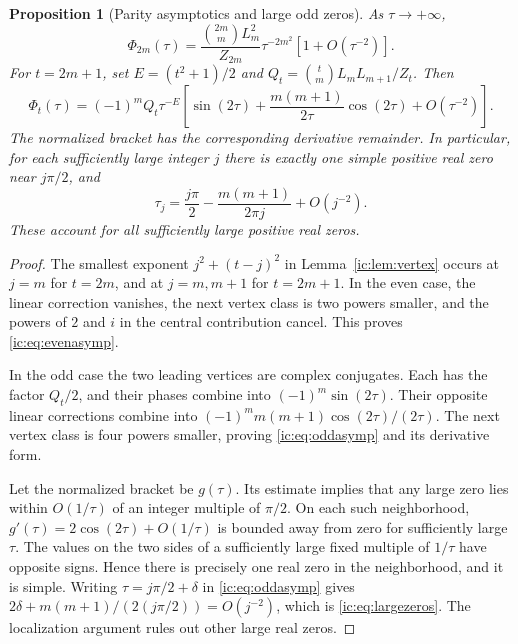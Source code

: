 \documentclass[11pt,a4paper]{article}
\numberwithin{equation}{section}
\newtheorem{proposition}[theorem]{Proposition}
\theoremstyle{definition}
\theoremstyle{remark}
\begin{document}
\begin{proposition}[Parity asymptotics and large odd zeros]
\label{ic:prop:largezeros}
As $\tau\to+\infty$,
\begin{equation}\label{ic:eq:evenasymp}
 \Phi_{2m}(\tau)=
 \frac{\binom{2m}{m}L_m^2}{Z_{2m}}
 \tau^{-2m^2}\left[1+O(\tau^{-2})\right].
\end{equation}
For $t=2m+1$, set $E=(t^2+1)/2$ and
$Q_t=\binom tm L_mL_{m+1}/Z_t$. Then
\begin{equation}\label{ic:eq:oddasymp}
 \Phi_t(\tau)=(-1)^m Q_t\tau^{-E}
 \left[\sin(2\tau)+\frac{m(m+1)}{2\tau}\cos(2\tau)
                  +O(\tau^{-2})\right].
\end{equation}
The normalized bracket has the corresponding derivative remainder.
In particular, for each sufficiently large integer $j$ there is exactly
one simple positive real zero near $j\pi/2$, and
\begin{equation}\label{ic:eq:largezeros}
 \tau_j=\frac{j\pi}{2}-\frac{m(m+1)}{2\pi j}+O(j^{-2}).
\end{equation}
These account for all sufficiently large positive real zeros.
\end{proposition}
\begin{proof}
The smallest exponent $j^2+(t-j)^2$ in Lemma~\ref{ic:lem:vertex} occurs
at $j=m$ for $t=2m$, and at $j=m,m+1$ for $t=2m+1$. In the even case,
the linear correction vanishes, the next vertex class is two powers
smaller, and the powers of $2$ and $i$ in the central contribution
cancel. This proves \eqref{ic:eq:evenasymp}.

In the odd case the two leading vertices are complex conjugates. Each
has the factor $Q_t/2$, and their phases combine into
$(-1)^m\sin(2\tau)$. Their opposite linear corrections combine into
$(-1)^m m(m+1)\cos(2\tau)/(2\tau)$. The next vertex class is four powers
smaller, proving \eqref{ic:eq:oddasymp} and its derivative form.

Let the normalized bracket be $g(\tau)$. Its estimate implies that any
large zero lies within $O(1/\tau)$ of an integer multiple of $\pi/2$.
On each such neighborhood, $g'(\tau)=2\cos(2\tau)+O(1/\tau)$ is bounded
away from zero for sufficiently large $\tau$. The values on the two
sides of a sufficiently large fixed multiple of $1/\tau$ have opposite
signs. Hence there is precisely one real zero in the neighborhood, and
it is simple. Writing $\tau=j\pi/2+\delta$ in \eqref{ic:eq:oddasymp} gives
$2\delta+m(m+1)/(2(j\pi/2))=O(j^{-2})$, which is
\eqref{ic:eq:largezeros}. The localization argument rules out other large
real zeros.
\end{proof}
\end{document}
